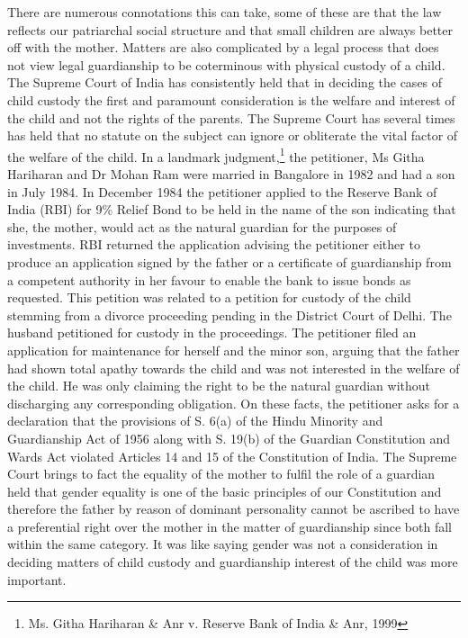 \begin{multicols}{2}
\noi
There are numerous connotations this can take, some of these are that the law reflects our
patriarchal social structure and that small children are always better off with the mother. Matters
are also complicated by a legal process that does not view legal guardianship to be coterminous
with physical custody of a child. The Supreme Court of India has consistently held that in deciding
the cases of child custody the first and paramount consideration is the welfare and interest of the
child and not the rights of the parents. The Supreme Court has several times has held that no
statute on the subject can ignore or obliterate the vital factor of the welfare of the child. In a
landmark judgment,\footnote{Ms. Githa Hariharan \& Anr v. Reserve Bank of India \& Anr, 1999} the petitioner, Ms Githa Hariharan and Dr Mohan Ram were married in
Bangalore in 1982 and had a son in July 1984. In December 1984 the petitioner applied to the
Reserve Bank of India (RBI) for 9\% Relief Bond to be held in the name of the son indicating that
she, the mother, would act as the natural guardian for the purposes of investments. RBI returned
the application advising the petitioner either to produce an application signed by the father or a
certificate of guardianship from a competent authority in her favour to enable the bank to issue
bonds as requested. This petition was related to a petition for custody of the child stemming from
a divorce proceeding pending in the District Court of Delhi. The husband petitioned for custody
in the proceedings. The petitioner filed an application for maintenance for herself and the minor
son, arguing that the father had shown total apathy towards the child and was not interested in the
welfare of the child. He was only claiming the right to be the natural guardian without discharging
any corresponding obligation. On these facts, the petitioner asks for a declaration that the
provisions of S. 6(a) of the Hindu Minority and Guardianship Act of 1956 along with S. 19(b) of
the Guardian Constitution and Wards Act violated Articles 14 and 15 of the Constitution of India.
The Supreme Court brings to fact the equality of the mother to fulfil the role of a guardian held
that gender equality is one of the basic principles of our Constitution and therefore the father by
reason of dominant personality cannot be ascribed to have a preferential right over the mother in
the matter of guardianship since both fall within the same category. It was like saying gender was
not a consideration in deciding matters of child custody and guardianship interest of the child was
more important.


\end{multicols}
